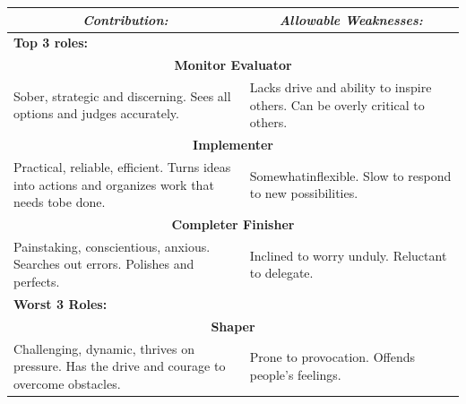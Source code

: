 \begin{table}[h]
\begin{tabular}{|p{}|p{}|}
\hline
\multicolumn{1}{|c|}{\textit{Contribution:}}                                                  & \multicolumn{1}{c|}{\textit{Allowable Weaknesses:}}                          \\ \hline
\multicolumn{2}{|l|}{\textbf{Top 3 roles:}}                                                                                                                                  \\ \hline
\multicolumn{2}{|c|}{\textbf{Monitor Evaluator}}                                                                                                                             \\ \hline
Sober, strategic and discerning. Sees all options and judges accurately.                      & Lacks drive and ability to inspire others. Can be overly critical to others. \\ \hline
\multicolumn{2}{|c|}{\textbf{Implementer}}                                                                                                                                   \\ \hline
Practical, reliable, efficient. Turns ideas into actions and organizes work that needs tobe done.& Somewhatinflexible. Slow to respond to new possibilities.                  \\ \hline
\multicolumn{2}{|c|}{\textbf{Completer Finisher}}                                                                                                                            \\ \hline
Painstaking, conscientious, anxious. Searches out errors. Polishes and perfects.              & Inclined to worry unduly. Reluctant to delegate.                             \\ \hline
\multicolumn{2}{|l|}{\textbf{Worst 3 Roles:}}                                                                                                                                \\ \hline
\multicolumn{2}{|c|}{\textbf{Shaper}}                                                                                                                                        \\ \hline
Challenging, dynamic, thrives on pressure. Has the drive and courage to overcome obstacles. & Prone to provocation. Offends people’s feelings.                             \\ \hline

\end{tabular}
\end{table}
